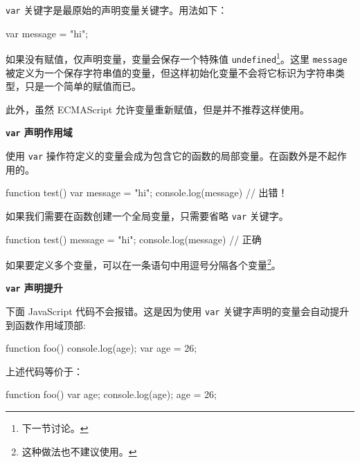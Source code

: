 \texttt{var} 关键字是最原始的声明变量关键字。用法如下：

\begin{JavaScript}
var message = "hi";
\end{JavaScript}

如果没有赋值，仅声明变量，变量会保存一个特殊值 \texttt{undefined}\footnote{下一节讨论。}。这里 \texttt{message} 被定义为一个保存字符串值的变量，但这样初始化变量不会将它标识为字符串类型，只是一个简单的赋值而已。

此外，虽然 ECMAScript 允许变量重新赋值，但是并不推荐这样使用。

\noindent\textbf{\texttt{var} 声明作用域}

使用 \texttt{var} 操作符定义的变量会成为包含它的函数的局部变量。在函数外是不起作用的。

\begin{JavaScript}
function test() {
    var message = "hi";
}
console.log(message)    // 出错！
\end{JavaScript}

如果我们需要在函数创建一个全局变量，只需要省略 \texttt{var} 关键字。

\begin{JavaScript}
function test() {
    message = "hi";
}
console.log(message)    // 正确
\end{JavaScript}


如果要定义多个变量，可以在一条语句中用逗号分隔各个变量\footnote{这种做法也不建议使用。}。

\noindent\textbf{\texttt{var} 声明提升}

下面 JavaScript 代码不会报错。这是因为使用 \texttt{var} 关键字声明的变量会自动提升到函数作用域顶部:

\begin{JavaScript}
function foo() {
    console.log(age);
    var age = 26;
}
\end{JavaScript}

上述代码等价于：

\begin{JavaScript}
function foo() {
    var age;
    console.log(age);
    age = 26;
}   
\end{JavaScript}


